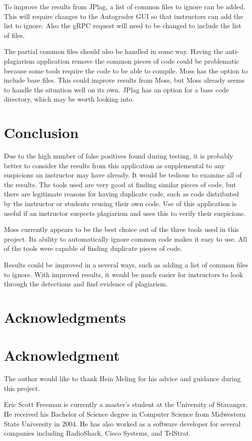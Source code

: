 \documentclass[10pt,journal,compsoc]{IEEEtran}
\begin{document}
	To improve the results from JPlag, a list of common files to ignore can be added. This will require changes to the Autograder GUI so that instructors can add the list to ignore. Also the gRPC request will need to be changed to include the list of files.
	
	The partial common files should also be handled in some way. Having the anti-plagiarism application remove the common pieces of code could be problematic because some tools require the code to be able to compile. Moss has the option to include base files. This could improve results from Moss, but Moss already seems to handle the situation well on its own. JPlag has an option for a base code directory, which may be worth looking into.
	
	\section{Conclusion}
	Due to the high number of false positives found during testing, it is probably better to consider the results from this application as supplemental to any suspicions an instructor may have already. It would be tedious to examine all of the results. The tools used are very good at finding similar pieces of code, but there are legitimate reasons for having duplicate code, such as code distributed by the instructor or students reusing their own code. Use of this application is useful if an instructor suspects plagiarism and uses this to verify their suspicions.
	
	Moss currently appears to be the best choice out of the three tools used in this project. Its ability to automatically ignore common code makes it easy to use. All of the tools were capable of finding duplicate pieces of code.
	
	Results could be improved in a several ways, such as adding a list of common files to ignore. With improved results, it would be much easier for instructors to look through the detections and find evidence of plagiarism.
	
	\ifCLASSOPTIONcompsoc
		\section*{Acknowledgments}
	\else
		\section*{Acknowledgment}
	\fi
	
	The author would like to thank Hein Meling for his advice and guidance during this project.
	
	
	

\begin{IEEEbiographynophoto}{Eric Scott Freeman}
is currently a master's student at the University of Stavanger. He received his Bachelor of Science degree in Computer Science from Midwestern State University in 2004. He has also worked as a software developer for several companies including RadioShack, Cisco Systems, and TelStrat.
\end{IEEEbiographynophoto}
\end{document}
